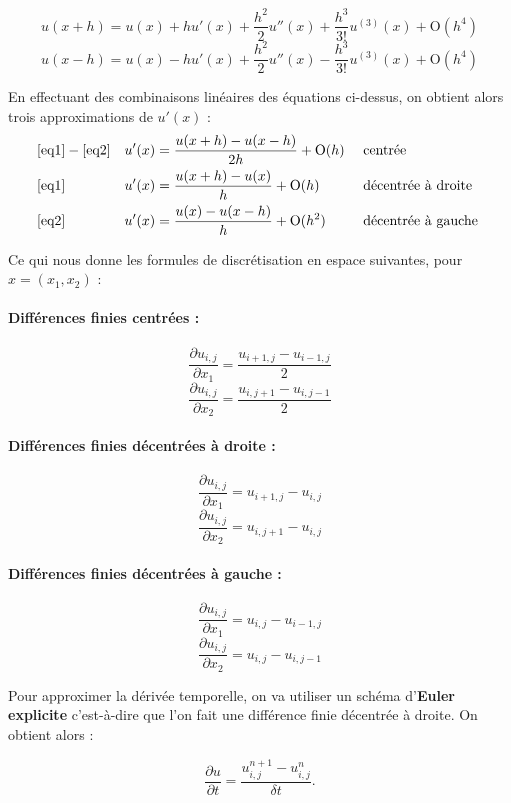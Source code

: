\documentclass[a4paper,12pt,twoside]{report}
\newcommand{\1}{\mathbb{1}}
\begin{document}
	\begin{equation}\label{eq1}
	u(x+h)=u(x)+hu'(x)+\frac{h^2}{2}u''(x)+\frac{h^3}{3!}u^{(3)}(x)+\mathrm{O}(h^4)
	\end{equation}
	\begin{equation}\label{eq2}	
	u(x-h)=u(x)-hu'(x)+\frac{h^2}{2}u''(x)-\frac{h^3}{3!}u^{(3)}(x)+\mathrm{O}(h^4)	
	\end{equation}


	En effectuant des combinaisons linéaires des équations ci-dessus, on obtient alors trois approximations de $u'(x)$ : \begin{align*}
	&\ref{eq1}-\ref{eq2} & u'(x)&=\frac{u(x+h)-u(x-h)}{2h}+\mathrm{O}(h) &&\text{ centrée }\\
	&\ref{eq1} & u'(x)&=\frac{u(x+h)-u(x)}{h}+\mathrm{O}(h) &&\text{ décentrée à droite }\\
	&\ref{eq2} &u'(x)&=\frac{u(x)-u(x-h)}{h}+\mathrm{O}(h^2) &&\text{ décentrée à gauche }
	\end{align*}
	
	Ce qui nous donne les formules de discrétisation en espace suivantes, pour $x=(x_1,x_2)$ :
	
	\paragraph{Différences finies centrées :}
	\[\frac{\partial u_{i,j}}{\partial x_1}=\frac{u_{i+1,j}-u_{i-1,j}}{2}\]
	\[\frac{\partial u_{i,j}}{\partial x_2}=\frac{u_{i,j+1}-u_{i,j-1}}{2}\]
	
	\paragraph{Différences finies décentrées à droite :}
	\[\frac{\partial u_{i,j}}{\partial x_1}=u_{i+1,j}-u_{i,j}\]
	\[\frac{\partial u_{i,j}}{\partial x_2}=u_{i,j+1}-u_{i,j}\]
	
	\paragraph{Différences finies décentrées à gauche :}
	\[\frac{\partial u_{i,j}}{\partial x_1}=u_{i,j}-u_{i-1,j}\]
	\[\frac{\partial u_{i,j}}{\partial x_2}=u_{i,j}-u_{i,j-1}\]

	Pour approximer la dérivée temporelle, on va utiliser un schéma d'\textbf{Euler explicite} c'est-à-dire que l'on fait une différence finie décentrée à droite. On obtient alors :
	
	\begin{equation*}
	\frac{\partial u}{\partial t}=\frac{u^{n+1}_{i,j}-u^{n}_{i,j}}{\delta t}.
	\end{equation*}
	
\end{document}

